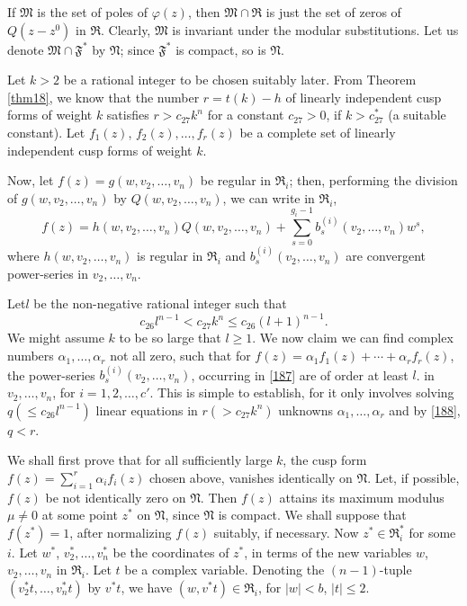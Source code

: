 If $\mathfrak{M}$ is the set of poles of $\varphi(z)$, then
$\mathfrak{M}\cap \mathfrak{R}$ is just the set of zeros of
$Q(z-z^{0})$ in $\mathfrak{R}$. Clearly, $\mathfrak{M}$ is invariant
under the modular substitutions. Let us denote $\mathfrak{M}\cap
\mathfrak{F}^{\ast}$ by $\mathfrak{N}$; since $\mathfrak{F}^{\ast}$ is
compact, so is $\mathfrak{N}$.

Let $k>2$ be a rational integer to be chosen suitably later. From
Theorem \ref{thm18}, we know that the number $r=t(k)-h$ of linearly
independent cusp forms of weight $k$ satisfies $r>c_{27}k^{n}$ for a
constant $c_{27}>0$, if $k>c^{\ast}_{27}$ (a suitable constant). Let
$f_{1}(z)$, $f_{2}(z),\ldots,f_{r}(z)$ be a complete set of linearly
independent cusp forms of weight $k$.

Now, let $f(z)=g(w,v_{2},\ldots,v_{n})$ be regular in
$\mathfrak{R}_{i}$; then, performing the division of
$g(w,v_{2},\ldots,v_{n})$ by $Q(w,v_{2},\ldots,v_{n})$, we can write
in $\mathfrak{R}_{i}$,
\begin{equation*}
f(z)=h(w,v_{2},\ldots,v_{n})Q(w,v_{2},\ldots,v_{n})+\sum^{g_{i}-1}_{s=0}b^{(i)}_{s}(v_{2},\ldots,v_{n})w^{s},\tag{187}\label{187} 
\end{equation*}
where $h(w,v_{2},\ldots,v_{n})$ is regular in $\mathfrak{R}_{i}$ and
$b^{(i)}_{s}(v_{2},\ldots,v_{n})$ are convergent power-series in
$v_{2},\ldots,v_{n}$. 

Let\pageoriginale $l$ be the non-negative rational integer such that
\begin{equation*}
c_{26}l^{n-1}<c_{27}k^{n}\leq c_{26}(l+1)^{n-1}.\tag{188}\label{188}
\end{equation*}
We might assume $k$ to be so large that $l\geq 1$. We now claim we can
find complex numbers $\alpha_{1},\ldots,\alpha_{r}$ not all zero, such
that for $f(z)=\alpha_{1}f_{1}(z)+\cdots+\alpha_{r}f_{r}(z)$, the
power-series $b^{(i)}_{s}(v_{2},\ldots,v_{n})$, occurring in
\eqref{187} are of order at least $l$. in $v_{2},\ldots,v_{n}$, for
$i=1,2,\ldots,c'$. This is simple to establish, for it only involves
solving $q(\leq c_{26}l^{n-1})$ linear equations in $r(>c_{27}k^{n})$
unknowns $\alpha_{1},\ldots,\alpha_{r}$ and by \eqref{188}, $q<r$.

We shall first prove that for all sufficiently large $k$, the cusp
form $f(z)=\sum\limits^{r}_{i=1}\alpha_{i}f_{i}(z)$ chosen above,
vanishes identically on $\mathfrak{N}$. Let, if possible, $f(z)$ be
not identically zero on $\mathfrak{N}$. Then $f(z)$ attains its
maximum modulus $\mu\neq 0$ at some point $z^{\ast}$ on
$\mathfrak{N}$, since $\mathfrak{N}$ is compact. We shall suppose that
$f(z^{\ast})=1$, after normalizing $f(z)$ suitably, if necessary. Now
$z^{\ast}\in\mathfrak{R}^{\ast}_{i}$ for some $i$. Let $w^{\ast}$,
$v^{\ast}_{2},\ldots,v^{\ast}_{n}$ be the coordinates of $z^{\ast}$,
in terms of the new variables $w$, $v_{2},\ldots,v_{n}$ in
$\mathfrak{R}_{i}$. Let $t$ be a complex variable. Denoting the
$(n-1)$-tuple $(v^{\ast}_{2}t,\ldots,v^{\ast}_{n}t)$ by $v^{\ast}t$,
we have $(w,v^{\ast}t)\in\mathfrak{R}_{i}$, for $|w|<b$, $|t|\leq 2$.

